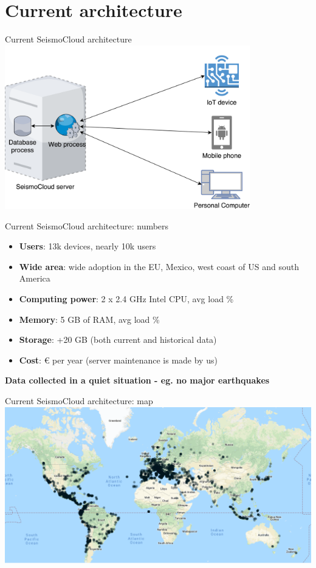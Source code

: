 
\section{Current architecture}

\begin{frame}{Current SeismoCloud architecture}
\centering
\includegraphics[width=0.8\textwidth]{scs-current-architecture}
\end{frame}


\begin{frame}{Current SeismoCloud architecture: numbers}
\begin{itemize}
  \item \textbf{Users}: \circa 13k devices, nearly 10k users
  \item \textbf{Wide area}: wide adoption in the EU, Mexico, west coast of US
  and south America
  \item \textbf{Computing power}: 2 x 2.4 GHz Intel CPU, avg load \%
  \item \textbf{Memory}: 5 GB of RAM, avg load \%
  \item \textbf{Storage}: +20 GB (both current and historical data)
  \item \textbf{Cost}:  € per year (server maintenance is made by us)
\end{itemize}

\textbf{Data collected in a quiet situation - eg. no major earthquakes}
\end{frame}


\begin{frame}{Current SeismoCloud architecture: map}
\includegraphics[width=\textwidth]{seismocloud_network}
\end{frame}


